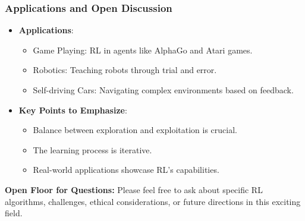\documentclass[aspectratio=169]{beamer}
\begin{document}
\begin{frame}[fragile]
    \frametitle{Applications and Open Discussion}
    \begin{itemize}
        \item \textbf{Applications}:
        \begin{itemize}
            \item Game Playing: RL in agents like AlphaGo and Atari games.
            \item Robotics: Teaching robots through trial and error.
            \item Self-driving Cars: Navigating complex environments based on feedback.
        \end{itemize}
        \item \textbf{Key Points to Emphasize}:
        \begin{itemize}
            \item Balance between exploration and exploitation is crucial.
            \item The learning process is iterative.
            \item Real-world applications showcase RL's capabilities.
        \end{itemize}
    \end{itemize}
    \textbf{Open Floor for Questions:} Please feel free to ask about specific RL algorithms, challenges, ethical considerations, or future directions in this exciting field.
\end{frame}
\end{document}
